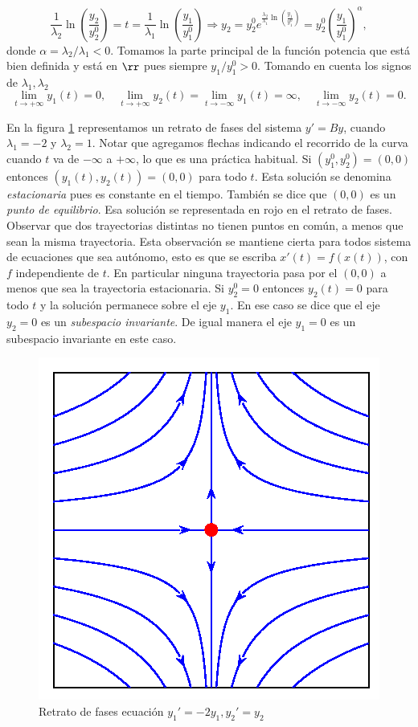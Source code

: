 \begin{equation}\label{eq:sillas2}
 \frac{1}{\lambda_2}\ln\left(\frac{y_2}{y_2^0}\right)=t=\frac{1}{\lambda_1}\ln\left(\frac{y_1}{y_1^0}\right)\Rightarrow  y_2=y_2^0e^{ \frac{\lambda_2}{\lambda_1}  \ln\left(\frac{y_1}{y_1^0}\right) }= y_2^0\left(\frac{y_1}{y_1^0}\right)^\alpha,
\end{equation}
donde $\alpha={\lambda_{2}}/{\lambda_{1}}<0$. Tomamos la parte principal de la función potencia que está bien definida y está en $\rr$ pues siempre $y_1/y_1^0>0$. Tomando en cuenta los signos de $\lambda_1,\lambda_2$
\[
 \lim_{t\to+\infty}y_1(t)=0,\quad \lim_{t\to+\infty}y_2(t)=\lim_{t\to-\infty}y_1(t)=\infty,\quad \lim_{t\to-\infty}y_2(t)=0.
\]

En la figura \ref{fig:silla} representamos un retrato de fases del sistema $y'=By$, cuando $\lambda_1=-2$ y $\lambda_2=1$. Notar que agregamos flechas indicando el recorrido de la curva cuando $t$ va de $-\infty$ a $+\infty$, lo que es una práctica habitual. Si $(y_1^0,y_2^0)=(0,0)$ entonces  $(y_1(t),y_2(t))=(0,0)$ para todo $t$. Esta solución se denomina \emph{estacionaria} pues es constante en el tiempo. También se dice que $(0,0)$ es un \emph{punto de equilibrio}. Esa solución se representada en rojo en el retrato de fases. Observar que dos trayectorias distintas no tienen puntos en común, a menos que sean la misma trayectoria. Esta observación se mantiene cierta para todos sistema de ecuaciones que sea autónomo, esto es que se escriba $x'(t)=f(x(t))$, con $f$ independiente de $t$. En particular ninguna trayectoria   pasa por el $(0,0)$ a menos que sea la trayectoria estacionaria.
Si $y_2^0=0$ entonces $y_2(t)=0$ para todo $t$ y la solución permanece sobre el eje $y_1$. En ese caso se dice que el eje $y_2=0$ es un \emph{subespacio invariante}. De igual manera el eje $y_1=0$ es un subespacio invariante en este caso.


\begin{figure}[h]
\begin{center}
\includegraphics[scale=.7]{imagenes/silla.png}
\caption{Retrato de fases ecuación $y_1'=-2y_1, y_2'=y_2$}\label{fig:silla}
\end{center}
\end{figure}


